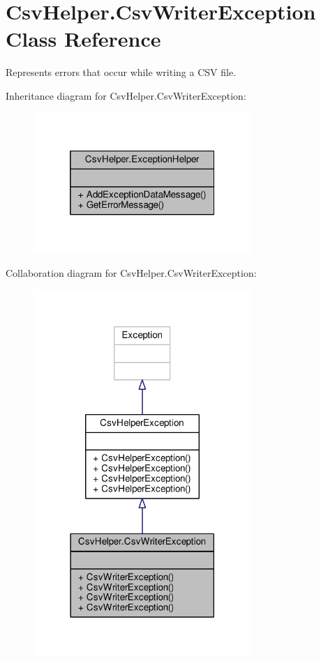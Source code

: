 \hypertarget{a00084}{\section{Csv\-Helper.\-Csv\-Writer\-Exception Class Reference}
\label{a00084}
}


Represents errors that occur while writing a C\-S\-V file.  




Inheritance diagram for Csv\-Helper.\-Csv\-Writer\-Exception\-:
\nopagebreak
\begin{figure}[H]
\begin{center}
\leavevmode
\includegraphics[width=234pt]{a00452}
\end{center}
\end{figure}


Collaboration diagram for Csv\-Helper.\-Csv\-Writer\-Exception\-:
\nopagebreak
\begin{figure}[H]
\begin{center}
\leavevmode
\includegraphics[width=234pt]{a00453}
\end{center}
\end{figure}
